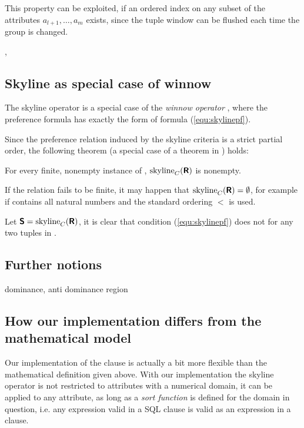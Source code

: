 
This property can be exploited, if an ordered index on any subset of the attributes $a_{l+1}, \ldots, a_m$ exists, since the tuple window can be flushed each time the group is changed.

, 

\subsection{Skyline as special case of winnow}
The skyline operator is a special case of the \emph{winnow operator} \citep{Chomicki2002}, where the preference formula has exactly the form of formula (\ref{equ:skylinepf}).

Since the preference relation induced by the skyline criteria is a strict partial order, the following theorem (a special case of a theorem in \citep{Chomicki2002}) holds:

\begin{theorem}\label{theorem:nonempty}
For every finite, nonempty instance  of , $\skyline_C(\relation{R})$ is nonempty.
\end{theorem}
If the relation  fails to be finite, it may happen that $\skyline_C(\relation{R}) = \emptyset$, for example if  contains all natural numbers and the standard ordering $<$ is used.


\begin{lemma}
Let $\relation{S} = \skyline_C(\relation{R})$, it is clear that condition (\ref{equ:skylinepf}) does not for any two tuples in .
\end{lemma}


\subsection{Further notions}
dominance, anti dominance region

\subsection{How our implementation differs from the mathematical model}
Our implementation of the  clause is actually a bit more flexible than the mathematical definition given above. With our implementation the skyline operator is not restricted to attributes with a numerical domain, it can be applied to any attribute, as long as a \emph{sort function} is defined for the domain in question, i.e.\/ any expression valid in a SQL  clause is valid as an expression in a  clause.

